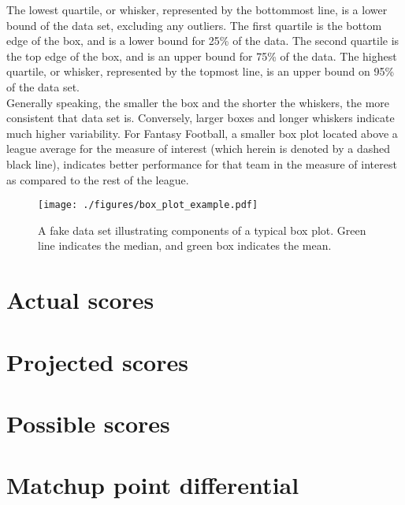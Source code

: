 \documentclass[12pt,letterpaper]{article}
\begin{document}
The lowest quartile, or whisker, represented by the bottommost line, is a lower bound of the data set, excluding any outliers. The first quartile is the bottom edge of the box, and is a lower bound for 25\% of the data. The second quartile is the top edge of the box, and is an upper bound for 75\% of the data. The highest quartile, or whisker, represented by the topmost line, is an upper bound on 95\% of the data set.\\

Generally speaking, the smaller the box and the shorter the whiskers, the more consistent that data set is. Conversely, larger boxes and longer whiskers indicate much higher variability. For Fantasy Football, a smaller box plot located above a league average for the measure of interest (which herein is denoted by a dashed black line), indicates better performance for that team in the measure of interest as compared to the rest of the league.
\begin{figure}[htb!]
\centering
\texttt{[image: ./figures/box\_plot\_example.pdf]}
\caption{A fake data set illustrating components of a typical box plot. Green line indicates the median, and green box indicates the mean.}
\label{fig:Box_plot_explained}
\end{figure}

\clearpage 
\section{Actual scores}
\label{sec:actual}
\section{Projected scores}
\label{sec:proj}
\section{Possible scores}
\label{sec:poss}
\section{Matchup point differential}
\label{sec:diff}
\end{document}
